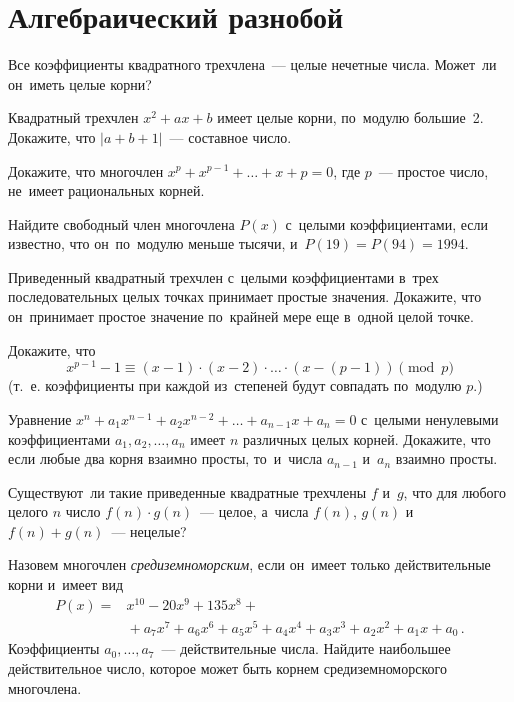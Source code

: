 
\section*{Алгебраический разнобой}


\begin{problems}

\item
Все коэффициенты квадратного трехчлена~— целые нечетные числа.
Может~ли он~иметь целые корни?

\item
Квадратный трехчлен $x^2 + a x + b$ имеет целые корни, по~модулю большие~2.
Докажите, что $\lvert a + b + 1 \rvert$~— составное число.

\item
Докажите, что многочлен $x^p + x^{p-1} + \ldots + x + p = 0$, где $p$~—
простое число, не~имеет рациональных корней.

\item
Найдите свободный член многочлена $P(x)$ с~целыми коэффициентами, если
известно, что он~по~модулю меньше тысячи, и~$P(19) = P(94) = 1994$.

\item
Приведенный квадратный трехчлен с~целыми коэффициентами в~трех
последовательных целых точках принимает простые значения.
Докажите, что он~принимает простое значение по~крайней мере еще в~одной
целой точке.

\item
Докажите, что
\[
    x^{p-1} - 1
\equiv
    (x - 1) \cdot (x - 2) \cdot \ldots \cdot (x - (p - 1))
\pmod{p}
\]
(т.~е. коэффициенты при каждой из~степеней будут совпадать по~модулю $p$.)

\item
Уравнение $x^n + a_1 x^{n-1} + a_2 x^{n-2} + \ldots + a_{n-1} x + a_n = 0$
с~целыми ненулевыми коэффициентами $a_1, a_2, \ldots, a_n$ имеет $n$ различных
целых корней.
Докажите, что если любые два корня взаимно просты, то~и~числа $a_{n-1}$ и~$a_n$
взаимно просты.

\item
Существуют~ли такие приведенные квадратные трехчлены $f$ и~$g$, что для любого
целого $n$ число $f(n) \cdot g(n)$~— целое, а~числа $f(n)$, $g(n)$
и~$f(n) + g(n)$~— нецелые?

\item
Назовем многочлен \emph{средиземноморским}, если он~имеет только действительные
корни и~имеет вид
\begin{align*}
    P(x)
={}&
    x^{10} - 20 x^9 + 135 x^8
    +\\&{}+
    a_7 x^7 + a_6 x^6 + a_5 x^5 + a_4 x^4 + a_3 x^3 + a_2 x^2 + a_1 x + a_0
\, . \end{align*}
Коэффициенты $a_0, \ldots, a_7$~— действительные числа.
Найдите наибольшее действительное
число, которое может быть корнем средиземноморского многочлена.

\end{problems}

